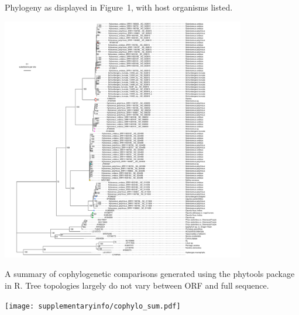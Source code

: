 \documentclass[11pt]{article}
\begin{document}
\begin{suppfigure}
\centering
\caption{
Phylogeny as displayed in {Figure~1}, with host organisms listed.
}
\includegraphics[width=0.8\textwidth]{supplementaryinfo/tree_rect_ufboot_hosts.pdf}
\label{fig:genetree5}
\end{suppfigure}
\clearpage

\begin{suppfigure}
\centering
\caption{
A summary of cophylogenetic comparisons generated using the phytools package in R. Tree topologies largely do not vary between ORF and full sequence.
}
\texttt{[image: supplementaryinfo/cophylo\_sum.pdf]}
\label{fig:genetree5}
\end{suppfigure}
\clearpage
\end{document}
